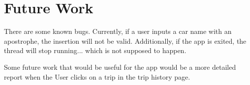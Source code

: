 \documentclass[twoside,twocolumn]{article}
\begin{document}
\section{Future Work}
There are some known bugs. Currently, if a user inputs a car name with an apostrophe, the insertion will not be valid. Additionally, if the app is exited, the thread will stop running... which is not supposed to happen.

Some future work that would be useful for the app would be a more detailed report when the User clicks on a trip in the trip history page.
\end{document}
